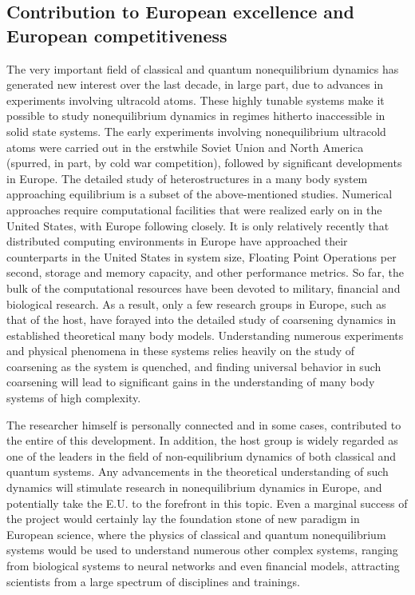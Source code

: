 \documentclass[a4paper,11pt,color]{article}
\begin{document}
\subsection{Contribution to European excellence and European competitiveness}
\label{sec:contribution_EU}
The very important field of classical and quantum nonequilibrium dynamics has generated new interest over the last decade, in large part, due to advances in experiments involving ultracold atoms. These highly tunable systems make it possible to study nonequilibrium dynamics in regimes hitherto inaccessible in solid state systems. The early experiments involving nonequilibrium ultracold atoms were carried out in the erstwhile Soviet Union and North America (spurred, in part, by cold war competition), followed by significant developments in Europe. The detailed study of heterostructures in a many body system approaching equilibrium is a subset of the above-mentioned studies. Numerical approaches require computational facilities that were realized early on in the United States, with Europe following closely. It is only relatively recently that distributed computing environments in Europe have approached their counterparts in the United States in system size, Floating Point Operations per second, storage and 
memory capacity, and other performance metrics. So far, the bulk of the computational resources have been devoted to military, financial and biological research. As a result, only a few research groups in Europe, such as that of the host, have forayed into the detailed study of coarsening dynamics in established theoretical many body models. Understanding numerous experiments and physical phenomena in these systems relies heavily on the study of coarsening as the system is quenched, and finding universal behavior in such coarsening will lead to significant gains in the understanding of many body systems of high complexity.

The researcher himself is personally connected and in some cases, contributed to the entire of this development. In addition, the host group is widely regarded as  one of the leaders in the field of non-equilibrium dynamics of both classical and quantum systems. Any advancements in the theoretical understanding of such dynamics will stimulate research in nonequilibrium dynamics in Europe, and potentially take the E.U. to the forefront in this topic. Even a marginal success of the project would certainly lay the foundation stone of new paradigm in European science, where the physics of classical and quantum nonequilibrium systems would be used to understand numerous other complex systems, ranging from biological systems to neural networks and even financial models, attracting scientists from a large spectrum of disciplines and trainings.
\end{document}
